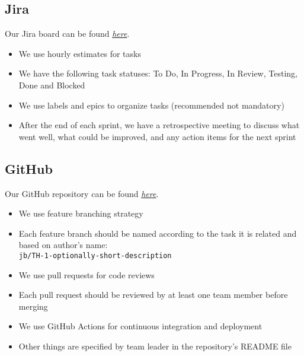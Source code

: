 \documentclass[12pt]{article}
\begin{document}
\subsection{Jira}
Our Jira board can be found \href{https://table-hub.atlassian.net/jira/software/projects/TH/boards/1}{\textit{here}}.
\begin{itemize}
    \item We use hourly estimates for tasks
    \item We have the following task statuses: To Do, In Progress, In Review, Testing, Done and Blocked
    \item We use labels and epics to organize tasks (recommended not mandatory)
    \item After the end of each sprint, we have a retrospective meeting to discuss what went well, what could be improved, and any action items for the next sprint
\end{itemize}
\subsection{GitHub}
Our GitHub repository can be found \href{https://github.com/Table-Hub-TUL}{\textit{here}}.
\begin{itemize}
    \item We use feature branching strategy
    \item Each feature branch should be named according to the task it is related and based on author's name: \\ \texttt{jb/TH-1-optionally-short-description}
    \item We use pull requests for code reviews
    \item Each pull request should be reviewed by at least one team member before merging
    \item We use GitHub Actions for continuous integration and deployment
    \item Other things are specified by team leader in the repository's README file
\end{itemize}
\end{document}
